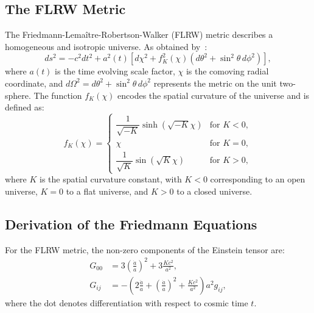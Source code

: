 \subsection{The FLRW Metric}
The Friedmann-Lemaître-Robertson-Walker (FLRW) metric describes a homogeneous and isotropic universe. As obtained by~\citet{1972gcpa.book.....W}:
\begin{equation}
    ds^2 = -c^2 dt^2 + a^2(t) \left[ d\chi^2 + f_K^2(\chi) \left( d\theta^2 + \sin^2\theta \, d\phi^2 \right) \right],
    \label{eq:flrw_metric}
\end{equation}
where \( a(t) \) is the time evolving scale factor, \( \chi \) is the comoving radial coordinate, and \( d\Omega^2 = d\theta^2 + \sin^2\theta \, d\phi^2 \) represents the metric on the unit two-sphere. The function \( f_K(\chi) \) encodes the spatial curvature of the universe and is defined as:
\begin{equation}
    f_K(\chi) = 
    \begin{cases}
        \dfrac{1}{\sqrt{-K}} \sinh\left(\sqrt{-K}\chi\right) & \text{for } K < 0, \\
        \chi & \text{for } K = 0, \\
        \dfrac{1}{\sqrt{K}} \sin\left(\sqrt{K}\chi\right) & \text{for } K > 0,
    \end{cases}
    \label{eq:fk_definition}
\end{equation}
where \( K \) is the spatial curvature constant, with \( K < 0 \) corresponding to an open universe, \( K = 0 \) to a flat universe, and \( K > 0 \) to a closed universe.

\subsection{Derivation of the Friedmann Equations}
For the FLRW metric, the non-zero components of the Einstein tensor are:
\begin{align}
    G_{00} &= 3\left( \frac{\dot{a}}{a} \right)^{2} + 3\frac{K c^2}{a^2}, \label{eq:G00_component} \\
    G_{ij} &= -\left( 2\frac{\ddot{a}}{a} + \left( \frac{\dot{a}}{a} \right)^2 + \frac{K c^2}{a^2} \right) a^2 g_{ij}, \label{eq:Gij_component}
\end{align}
where the dot denotes differentiation with respect to cosmic time \( t \).

